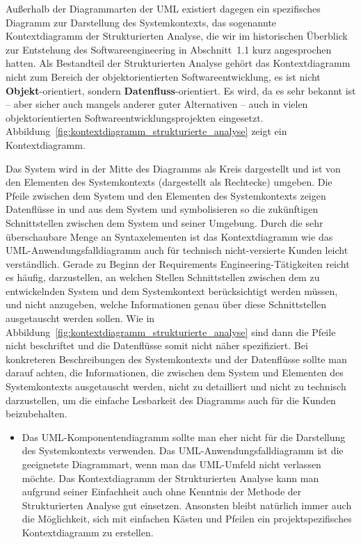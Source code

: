 Außerhalb  der Diagrammarten der UML existiert dagegen ein spezifisches Diagramm zur Darstellung des Systemkontexts, das sogenannte Kontextdiagramm der Strukturierten Analyse, die wir im historischen Überblick zur Entstehung des Software\-engineering in Abschnitt~1.1 kurz %
angesprochen hatten. Als Bestandteil der Strukturierten Analyse gehört das Kontextdiagramm nicht zum Bereich der objektorientierten Softwareentwicklung, es ist nicht \textbf{Objekt}-orientiert, sondern \textbf{Datenfluss}-orientiert. Es wird, da es sehr bekannt ist -- aber sicher auch mangels anderer guter Alternativen -- auch in vielen objektorientierten Softwareentwicklungsprojekten eingesetzt. Abbildung~\ref{fig:kontextdiagramm_strukturierte_analyse} zeigt ein Kontextdiagramm.

Das System wird in der Mitte des Diagramms als Kreis dargestellt und ist von den Elementen des Systemkontexts (dargestellt als Rechtecke) umgeben. Die Pfeile zwischen dem System und den Elementen des Systemkontexts zeigen Datenflüsse in und aus dem System und symbolisieren so die zukünftigen Schnittstellen zwischen dem System und seiner Umgebung. Durch die sehr überschaubare Menge an Syntax\-elementen ist das Kontextdiagramm wie das UML-Anwendungsfalldiagramm auch für technisch nicht-versierte Kunden leicht verständlich. Gerade zu Beginn der Require\-ments Engineering-Tätigkeiten reicht es häufig, darzustellen, an welchen Stellen Schnittstellen zwischen dem zu entwickelnden System und dem System\-kontext berücksichtigt werden müssen, und nicht anzugeben, welche Informationen genau über diese Schnittstellen ausgetauscht werden sollen. Wie in Abbildung~\ref{fig:kontextdiagramm_strukturierte_analyse} sind dann die Pfeile nicht beschriftet und die Datenflüsse somit nicht näher spezifiziert. Bei konkreteren Beschreibungen des Systemkontexts und der Datenflüsse sollte man darauf achten, die Informationen, die zwischen dem System und Elementen des Systemkontexts ausgetauscht werden, nicht zu detailliert und nicht zu technisch darzustellen, um die einfache Lesbarkeit des Diagramms auch für die Kunden beizubehalten. 

\begin{itemize}[
	label={\sttpHervorhebung{$\Rightarrow$}},
	]
	\item Das UML-Komponentendiagramm sollte man eher nicht für die Darstellung des Systemkontexts verwenden. Das UML-Anwendungsfalldiagramm ist die geeignetste Diagrammart, wenn man das UML-Umfeld nicht verlassen möchte. Das Kontextdiagramm der Strukturierten Analyse kann man aufgrund seiner Einfachheit auch ohne Kenntnis der Methode der Strukturierten Analyse gut einsetzen. Ansonsten bleibt natürlich immer auch die Möglichkeit, sich mit einfachen Kästen und Pfeilen ein projektspezifisches Kontextdiagramm zu erstellen.
\end{itemize}